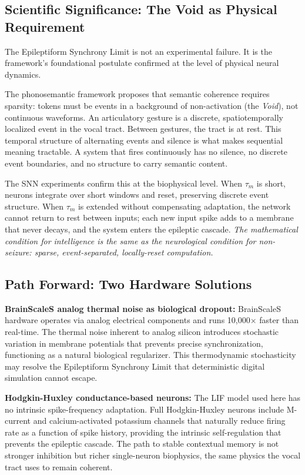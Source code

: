 \documentclass[12pt]{article}
\begin{document}
\subsection{Scientific Significance: The Void as Physical Requirement}

The Epileptiform Synchrony Limit is not an experimental failure. It is the framework's foundational postulate confirmed at the level of physical neural dynamics.

The phonosemantic framework proposes that semantic coherence requires sparsity: tokens must be events in a background of non-activation (the \textit{Void}), not continuous waveforms. An articulatory gesture is a discrete, spatiotemporally localized event in the vocal tract. Between gestures, the tract is at rest. This temporal structure of alternating events and silence is what makes sequential meaning tractable. A system that fires continuously has no silence, no discrete event boundaries, and no structure to carry semantic content.

The SNN experiments confirm this at the biophysical level. When $\tau_m$ is short, neurons integrate over short windows and reset, preserving discrete event structure. When $\tau_m$ is extended without compensating adaptation, the network cannot return to rest between inputs; each new input spike adds to a membrane that never decays, and the system enters the epileptic cascade. \textit{The mathematical condition for intelligence is the same as the neurological condition for non-seizure: sparse, event-separated, locally-reset computation.}

\subsection{Path Forward: Two Hardware Solutions}

\textbf{BrainScaleS analog thermal noise as biological dropout:} BrainScaleS hardware operates via analog electrical components and runs 10{,}000$\times$ faster than real-time. The thermal noise inherent to analog silicon introduces stochastic variation in membrane potentials that prevents precise synchronization, functioning as a natural biological regularizer. This thermodynamic stochasticity may resolve the Epileptiform Synchrony Limit that deterministic digital simulation cannot escape.

\textbf{Hodgkin-Huxley conductance-based neurons:} The LIF model used here has no intrinsic spike-frequency adaptation. Full Hodgkin-Huxley neurons include M-current and calcium-activated potassium channels that naturally reduce firing rate as a function of spike history, providing the intrinsic self-regulation that prevents the epileptic cascade. The path to stable contextual memory is not stronger inhibition but richer single-neuron biophysics, the same physics the vocal tract uses to remain coherent.
\end{document}

